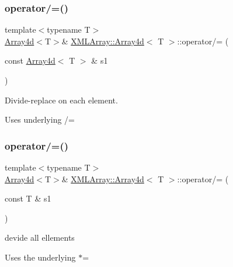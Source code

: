 \subsubsection{\texorpdfstring{operator/=()}{operator/=()}\hspace{0.1cm}{\footnotesize\ttfamily [2/4]}}
{\footnotesize\ttfamily template$<$typename T$>$ \\
\mbox{\hyperlink{classXMLArray_1_1Array4d}{Array4d}}$<$T$>$\& \mbox{\hyperlink{classXMLArray_1_1Array4d}{X\+M\+L\+Array\+::\+Array4d}}$<$ T $>$\+::operator/= (\begin{DoxyParamCaption}\item[{const \mbox{\hyperlink{classXMLArray_1_1Array4d}{Array4d}}$<$ T $>$ \&}]{s1 }\end{DoxyParamCaption})\hspace{0.3cm}{\ttfamily [inline]}}



Divide-\/replace on each element. 

Uses underlying /= \mbox{\label{classXMLArray_1_1Array4d_a22b262f7b7905313ae8e21d5e2d717a7}} 
\subsubsection{\texorpdfstring{operator/=()}{operator/=()}\hspace{0.1cm}{\footnotesize\ttfamily [3/4]}}
{\footnotesize\ttfamily template$<$typename T$>$ \\
\mbox{\hyperlink{classXMLArray_1_1Array4d}{Array4d}}$<$T$>$\& \mbox{\hyperlink{classXMLArray_1_1Array4d}{X\+M\+L\+Array\+::\+Array4d}}$<$ T $>$\+::operator/= (\begin{DoxyParamCaption}\item[{const T \&}]{s1 }\end{DoxyParamCaption})\hspace{0.3cm}{\ttfamily [inline]}}



devide all ellements 

Uses the underlying $\ast$= \mbox{\label{classXMLArray_1_1Array4d_a22b262f7b7905313ae8e21d5e2d717a7}} 
